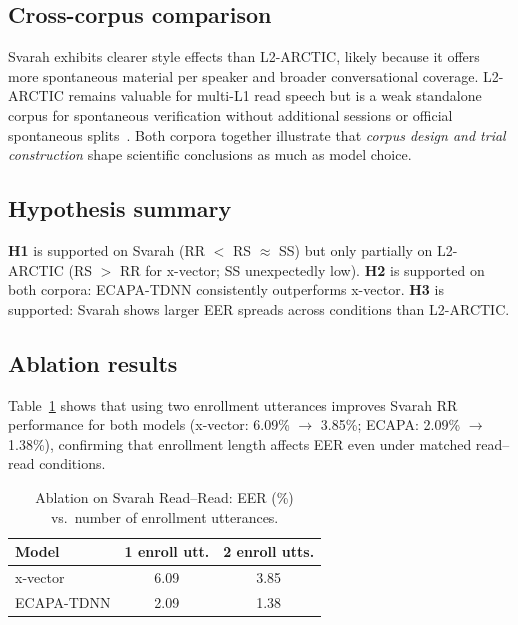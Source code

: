 \documentclass[cameraready]{Interspeech}
\begin{document}
\subsection{Cross-corpus comparison}

Svarah exhibits clearer style effects than L2-ARCTIC, likely because it offers more spontaneous material per speaker and broader conversational coverage. L2-ARCTIC remains valuable for multi-L1 read speech but is a weak standalone corpus for spontaneous verification without additional sessions or official spontaneous splits~\cite{zhao2018l2arctic}. Both corpora together illustrate that \emph{corpus design and trial construction} shape scientific conclusions as much as model choice.

\subsection{Hypothesis summary}

\textbf{H1} is supported on Svarah (RR $<$ RS $\approx$ SS) but only partially on L2-ARCTIC (RS $>$ RR for x-vector; SS unexpectedly low). \textbf{H2} is supported on both corpora: ECAPA-TDNN consistently outperforms x-vector. \textbf{H3} is supported: Svarah shows larger EER spreads across conditions than L2-ARCTIC.

\subsection{Ablation results}

Table~\ref{tab:ablation} shows that using two enrollment utterances improves Svarah RR performance for both models (x-vector: 6.09\% $\rightarrow$ 3.85\%; ECAPA: 2.09\% $\rightarrow$ 1.38\%), confirming that enrollment length affects EER even under matched read--read conditions.

\begin{table}[t]
  \caption{Ablation on Svarah Read--Read: EER (\%) vs.\ number of enrollment utterances.}
  \label{tab:ablation}
  \centering
  \begin{tabular}{lcc}
    \toprule
    Model & 1 enroll utt. & 2 enroll utts. \\
    \midrule
    x-vector & 6.09 & 3.85 \\
    ECAPA-TDNN & 2.09 & 1.38 \\
    \bottomrule
  \end{tabular}
\end{table}
\end{document}
